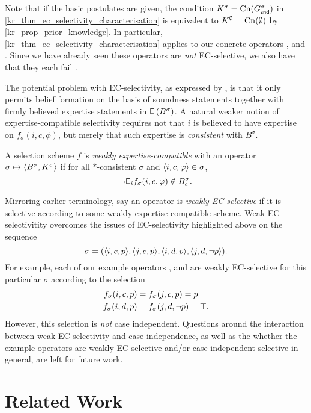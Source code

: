 Note that if the basic postulates are given, the condition $K^\sigma =
\operatorname{Cn}(G^\sigma_{\mathsf{snd}})$ in \cref{kr_thm_ec_selectivity_characterisation} is
equivalent to $K^\emptyset = \operatorname{Cn}(\emptyset)$ by \cref{kr_prop_prior_knowledge}.
In particular, \cref{kr_thm_ec_selectivity_characterisation} applies to our
concrete operators \varbasedcond{}, \partbasedcond{} and \scorebasedop{}. Since
we have already seen these operators are \emph{not} EC-selective, we also have
that they each fail \determination{}.

The potential problem with EC-selectivity, as expressed by \determination{}, is
that it only permits belief formation on the basis of soundness statements
together with firmly believed expertise statements in $\operatorname{\mathsf{E}}\left({B^\sigma}\right)$. A
natural weaker notion of expertise-compatible selectivity requires not that $i$
is believed to have expertise on $f_\sigma(i, c, \phi)$, but merely that such
expertise is \emph{consistent} with $B^\sigma$.

\begin{definition}
    A selection scheme $f$ is \emph{weakly expertise-compatible} with an
    operator $\sigma \mapsto \langle {B^\sigma, K^\sigma} \rangle$ if for all
    $\ast$-consistent $\sigma$ and $\langle {i, c, \varphi} \rangle \in \sigma$,
    \[
        \neg\mathsf{E}_i{f_\sigma(i, c, \varphi)} \notin B^\sigma_c.
    \]
\end{definition}

Mirroring earlier terminology, say an operator is \emph{weakly EC-selective} if
it is selective according to some weakly expertise-compatible scheme. Weak
EC-selectivitity overcomes the issues of EC-selectivity highlighted above on
the sequence
\[
    \sigma = ( \langle {i, c, p} \rangle, \langle {j, c, p} \rangle, \langle {i, d, p} \rangle,
    \langle {j, d, \neg p} \rangle).
\]
For example, each of our example operators
\varbasedcond{}, \partbasedcond{} and \scorebasedop{} are weakly EC-selective
for this particular $\sigma$ according to the selection
\begin{align*}
    f_\sigma(i, c, p) &= f_\sigma(j, c, p) = p \\
    f_\sigma(i, d, p) &= f_\sigma(j, d, \neg{p}) = \top.
\end{align*}
However, this selection is \emph{not} case independent. Questions around the
interaction between weak EC-selectivity and case independence, as well as the
whether the example operators are weakly EC-selective and/or
case-independent-selective in general, are left for future work.

\section{Related Work}
\label{kr_sec_relatedwork}

